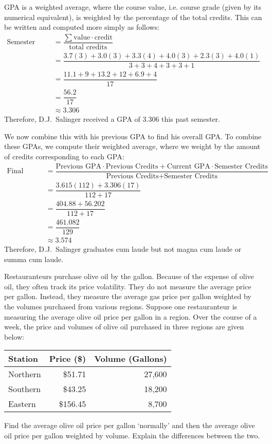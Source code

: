 \documentclass[11pt,letterpaper]{article}
\begin{document}
\sol GPA is a weighted average, where the course value, i.e. course grade (given by its numerical equivalent), is weighted by the percentage of the total credits. This can be written and computed more simply as follows:
	\[
	\begin{aligned}
	\text{Semester GPA}&= \dfrac{\sum \text{value} \cdot \text{credit}}{\text{total credits}} \\[0.3cm]
	&= \dfrac{3.7(3) + 3.0(3) + 3.3(4) + 4.0(3) + 2.3(3) + 4.0(1)}{3 + 3 + 4 + 3 + 3 + 1} \\[0.3cm]
	&= \dfrac{11.1 + 9 + 13.2 + 12 + 6.9 + 4}{17} \\[0.3cm]
	&= \dfrac{56.2}{17} \\[0.3cm]
	&\approx 3.306
	\end{aligned}
	\] 
Therefore, D.J.~Salinger received a GPA of 3.306 this past semester. \pspace

We now combine this with his previous GPA to find his overall GPA. To combine these GPAs, we compute their weighted average, where we weight by the amount of credits corresponding to each GPA:
	\[
	\begin{aligned}
	\text{Final GPA}&= \dfrac{\text{Previous GPA} \cdot \text{Previous Credits} + \text{Current GPA} \cdot \text{Semester Credits}}{\text{Previous Credits} + \text{Semester Credits}} \\[0.3cm]
	&= \dfrac{3.615(112) + 3.306(17)}{112 + 17} \\[0.3cm]
	&= \dfrac{404.88 + 56.202}{112 + 17} \\[0.3cm]
	&= \dfrac{461.082}{129} \\[0.3cm]
	&\approx 3.574
	\end{aligned}
	\]
Therefore, D.J.~Salinger graduates cum laude but not magna cum laude or summa cum laude. 



\newpage



Restauranteurs purchase olive oil by the gallon. Because of the expense of olive oil, they often track its price volatility. They do not measure the average price per gallon. Instead, they measure the average gas price per gallon weighted by the volumes purchased from various regions. Suppose one restauranteur is measuring the average olive oil price per gallon in a region. Over the course of a week, the price and volumes of olive oil purchased in three regions are given below: \par
	\begin{table}[!ht]
	\centering
        \begin{tabular}{lrr} \hline
	Station & Price (\$) & Volume (Gallons) \\ \hline
	Northern & \$51.71 & 27,600 \\
	Southern & \$43.25 & 18,200 \\
	Eastern & \$156.45 & 8,700
        \end{tabular}
	\end{table} \par
Find the average olive oil price per gallon `normally' and then the average olive oil price per gallon weighted by volume. Explain the differences between the two. \pspace
\end{document}
